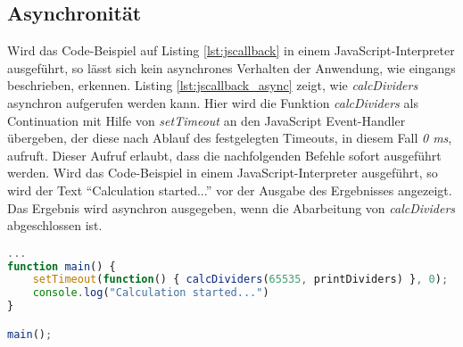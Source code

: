 \subsection*{Asynchronität}
Wird das Code-Beispiel auf Listing \ref{lst:jscallback} in einem JavaScript-Interpreter ausgeführt, so lässt sich kein asynchrones Verhalten der Anwendung, wie eingangs beschrieben, erkennen. Listing \ref{lst:jscallback_async} zeigt, wie \textit{calcDividers} asynchron aufgerufen werden kann. Hier wird die Funktion \mbox{\textit{calcDividers}} als Continuation mit Hilfe von \textit{setTimeout} an den JavaScript Event-Handler übergeben, der diese nach Ablauf des festgelegten Timeouts, in diesem Fall \textit{0 ms}, aufruft. Dieser Aufruf erlaubt, dass die nachfolgenden Befehle sofort ausgeführt werden. Wird das Code-Beispiel in einem JavaScript-Interpreter ausgeführt, so wird der Text ``Calculation started...'' vor der Ausgabe des Ergebnisses angezeigt. Das Ergebnis wird asynchron ausgegeben, wenn die Abarbeitung von \textit{calcDividers} abgeschlossen ist.
\begin{lstlisting}[language=JavaScript,caption=JavaScript setTimeout Beispiel,label=lst:jscallback_async]
...
function main() {
	setTimeout(function() { calcDividers(65535, printDividers) }, 0);
	console.log("Calculation started...")
}

main();
\end{lstlisting}
\acresetall

